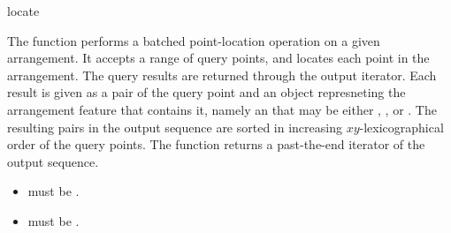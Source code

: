 \ccRefPageBegin

\begin{ccRefFunction}{locate}

\ccDefinition

The function \ccRefName{} performs a batched point-location operation on a
given arrangement. It accepts a range of query points, and locates each
point in the arrangement. The query results are returned through the output
iterator. Each result is given as a pair of the query point and an object
represneting the arrangement feature that contains it, namely an
 that may be either ,
, or . The resulting
pairs in the output sequence are sorted in increasing $xy$-lexicographical
order of the query points. The function returns a past-the-end iterator of
the output sequence.



\ccRequirements
\begin{itemize}
\item {} must be .
\item {} must be
  .
\end{itemize}

\end{ccRefFunction}

\ccRefPageEnd
